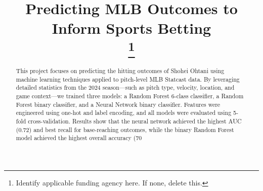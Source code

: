 \documentclass[conference]{IEEEtran}
\begin{document}
\title{Predicting MLB Outcomes to Inform Sports Betting\\
\thanks{Identify applicable funding agency here. If none, delete this.}
}

\author{
\and
{}
\and
{}
\and
{}
\and
{}
\and
{}
}

\maketitle

\begin{abstract}
This project focuses on predicting the hitting outcomes of Shohei Ohtani using machine learning techniques applied to pitch-level MLB Statcast data. By leveraging detailed statistics from the 2024 season—such as pitch type, velocity, location, and game context—we trained three models: a Random Forest 6-class classifier, a Random Forest binary classifier, and a Neural Network binary classifier. Features were engineered using one-hot and label encoding, and all models were evaluated using 5-fold cross-validation. Results show that the neural network achieved the highest AUC (0.72) and best recall for base-reaching outcomes, while the binary Random Forest model achieved the highest overall accuracy (70%
\end{abstract}
\end{document}
